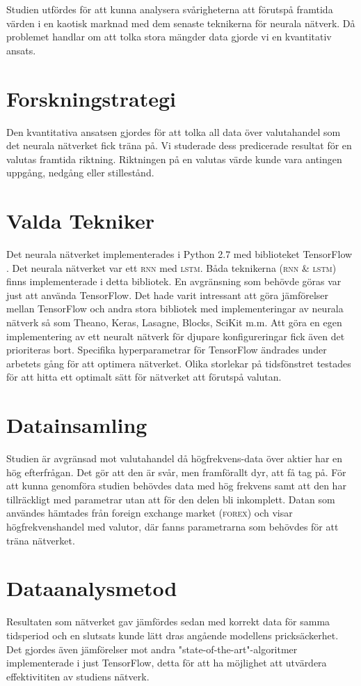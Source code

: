 Studien utfördes för att kunna analysera svårigheterna att förutspå framtida
värden i en kaotisk marknad med dem senaste teknikerna för neurala nätverk.  Då
problemet handlar om att tolka stora mängder data gjorde vi en kvantitativ
ansats.

\section{Forskningstrategi}
Den kvantitativa ansatsen gjordes för att tolka all data över valutahandel som
det neurala nätverket fick träna på.  Vi studerade dess predicerade resultat för
en valutas framtida riktning.  Riktningen på en valutas värde kunde vara
antingen uppgång, nedgång eller stillestånd.

\section{Valda Tekniker}
Det neurala nätverket implementerades i Python 2.7 med biblioteket TensorFlow
\citep{tensorflow2015-whitepaper}.  Det neurala nätverket var ett \textsc{rnn}
med \textsc{lstm}.  Båda teknikerna \textsc{(rnn \& lstm)} finns implementerade
i detta bibliotek.  En avgränsning som behövde göras var just att använda
TensorFlow.  Det hade varit intressant att göra jämförelser mellan TensorFlow
och andra stora bibliotek med implementeringar av neurala nätverk så som Theano,
Keras, Lasagne, Blocks, SciKit m.m.  Att göra en egen implementering av ett
neuralt nätverk för djupare konfigureringar fick även det prioriteras bort.
Specifika hyperparametrar för TensorFlow ändrades under arbetets gång för att
optimera nätverket.  Olika storlekar på tidsfönstret testades för att hitta ett
optimalt sätt för nätverket att förutspå valutan.

\section{Datainsamling}
Studien är avgränsad mot valutahandel då högfrekvens-data över aktier har en hög
efterfrågan.  Det gör att den är svår, men framförallt dyr, att få tag på.  För
att kunna genomföra studien behövdes data med hög frekvens samt att den har
tillräckligt med parametrar utan att för den delen bli inkomplett.  Datan som
användes hämtades från foreign exchange market \textsc{(forex)} och visar
högfrekvenshandel med valutor, där fanns parametrarna som behövdes för att träna
nätverket.

\section{Dataanalysmetod}
Resultaten som nätverket gav jämfördes sedan med korrekt data för samma
tidsperiod och en slutsats kunde lätt dras angående modellens pricksäckerhet.
Det gjordes även jämförelser mot andra "state-of-the-art"-algoritmer
implementerade i just TensorFlow, detta för att ha möjlighet att utvärdera
effektivititen av studiens nätverk.
